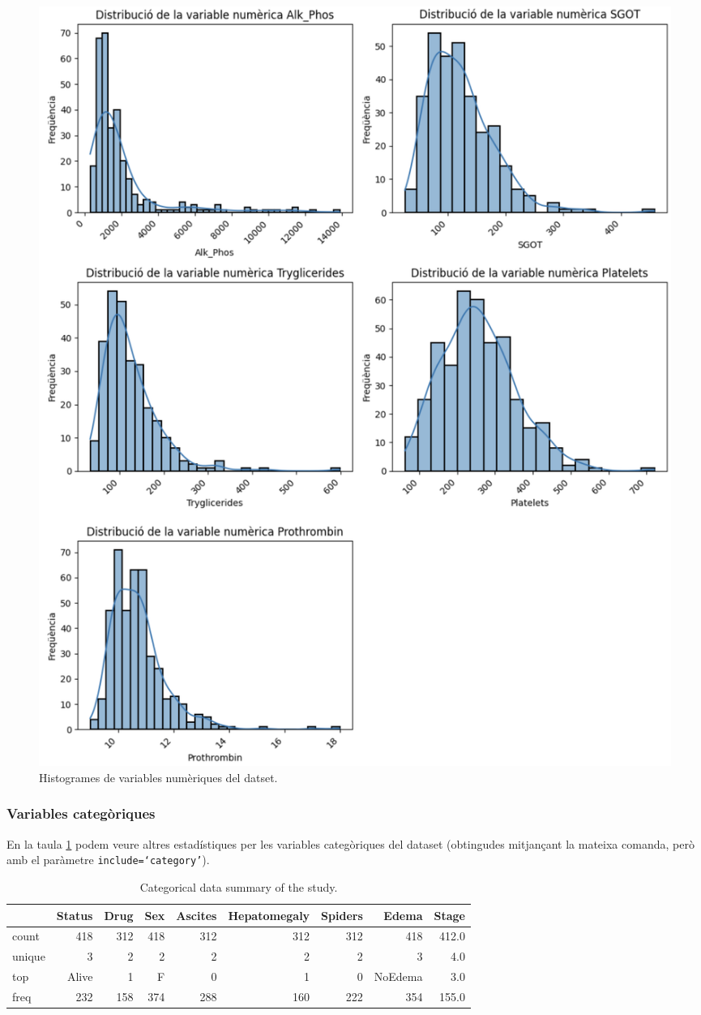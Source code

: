 \begin{figure}[H]
    \centering
    \includegraphics[width=\linewidth]{img/num-histograms-2.png}
    \caption{Histogrames de variables numèriques del datset.}
    \label{fig:num-histograms-2}
\end{figure}

\subsubsection{Variables categòriques}
En la taula \ref{tab:cat-stats-1} podem veure altres estadístiques per les variables categòriques del dataset (obtingudes mitjançant la mateixa comanda, però amb el paràmetre \texttt{include=`category'}).

\begin{table}[H]
\centering
\begin{tabular}{lrrrrrrrr}
\hline
\textbf{} & \textbf{Status} & \textbf{Drug} & \textbf{Sex} & \textbf{Ascites} & \textbf{Hepatomegaly} & \textbf{Spiders} & \textbf{Edema} & \textbf{Stage} \\ 
\hline
count & 418 & 312 & 418 & 312 & 312 & 312 & 418 & 412.0 \\ 
unique & 3 & 2 & 2 & 2 & 2 & 2 & 3 & 4.0 \\ 
top & Alive & 1 & F & 0 & 1 & 0 & NoEdema & 3.0 \\ 
freq & 232 & 158 & 374 & 288 & 160 & 222 & 354 & 155.0 \\ 
\hline
\end{tabular}
\caption{Categorical data summary of the study.}
\label{tab:cat-stats-1}
\end{table}

